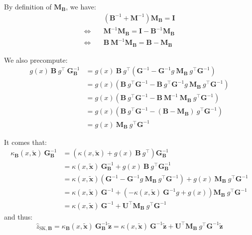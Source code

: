 By definition of $\mathbf{M}_{\mathbf{B}}$, we have:
\begin{equation}
	\begin{aligned}
	&\left(\mathbf{B}^{-1}+\mathbf{M}^{-1}\right)\mathbf{M}_{\mathbf{B}}=\mathbf{I}\\
	\iff\quad&\mathbf{M}^{-1}\mathbf{M}_{\mathbf{B}}=\mathbf{I}-\mathbf{B}^{-1}\mathbf{M}_{\mathbf{B}}\\
	\iff\quad&\mathbf{B}\:\mathbf{M}^{-1}\mathbf{M}_{\mathbf{B}}=\mathbf{B}-\mathbf{M}_{\mathbf{B}}
	\end{aligned}\label{eq:M_B_identity}
\end{equation}

We also precompute:
\begin{equation}
	\begin{aligned}
	g(x)\:\mathbf{B}\:g^\top\:\mathbf{G}_{\mathbf{B}}^{-1}&=g(x)\:\mathbf{B}\:g^\top\left(\mathbf{G}^{-1}-\mathbf{G}^{-1}g\:\mathbf{M}_{\mathbf{B}}\:g^\top \mathbf{G}^{-1}\right)\\
	&=g(x)\left(\mathbf{B}\:g^\top \mathbf{G}^{-1}-\mathbf{B}\:g^\top \mathbf{G}^{-1}g\:\mathbf{M}_{\mathbf{B}}\:g^\top \mathbf{G}^{-1}\right)\\
	&=g(x)\left(\mathbf{B}\:g^\top \mathbf{G}^{-1}-\mathbf{B}\:\mathbf{M}^{-1}\:\mathbf{M}_{\mathbf{B}}\:g^\top \mathbf{G}^{-1}\right)\\
	&=g(x)\left(\mathbf{B}\:g^\top \mathbf{G}^{-1}-(\mathbf{B}-\mathbf{M}_{\mathbf{B}})\:g^\top \mathbf{G}^{-1}\right)\\
	&=g(x)\:\mathbf{M}_{\mathbf{B}}\:g^\top \mathbf{G}^{-1}
	\end{aligned}
\end{equation}

It comes that:
\begin{equation}
	\begin{aligned}
	\kappa_{\mathbf{B}}(x,\tilde{\mathbf{x}})\:\mathbf{G}_{\mathbf{B}}^{-1}&=\left(\kappa(x,\tilde{\mathbf{x}})+g(x)\:\mathbf{B}\:g^\top\right)\mathbf{G}_{\mathbf{B}}^{-1}\\
	&=\kappa(x,\tilde{\mathbf{x}})\:\mathbf{G}_{\mathbf{B}}^{-1}+g(x)\:\mathbf{B}\:g^\top \mathbf{G}_{\mathbf{B}}^{-1}\\
	&=\kappa(x,\tilde{\mathbf{x}})\left(\mathbf{G}^{-1}-\mathbf{G}^{-1}g\:\mathbf{M}_{\mathbf{B}}\:g^\top \mathbf{G}^{-1}\right)+g(x)\:\mathbf{M}_{\mathbf{B}}\:g^\top \mathbf{G}^{-1}\\
	&=\kappa(x,\tilde{\mathbf{x}})\:\mathbf{G}^{-1}+\left(-\kappa(x,\tilde{\mathbf{x}})\:\mathbf{G}^{-1}g+g(x)\right)\mathbf{M}_{\mathbf{B}}\:g^\top \mathbf{G}^{-1}\\
	&=\kappa(x,\tilde{\mathbf{x}})\:\mathbf{G}^{-1}+\mathbf{U}^\top \mathbf{M}_{\mathbf{B}}\:g^\top \mathbf{G}^{-1}
	\end{aligned}
\end{equation}
and thus:
\begin{equation}
	\hat{z}_{\mathrm{SK},\mathbf{B}}=\kappa_{\mathbf{B}}(x,\tilde{\mathbf{x}})\:\mathbf{G}_{\mathbf{B}}^{-1}\tilde{\mathbf{z}}=\kappa(x,\tilde{\mathbf{x}})\:\mathbf{G}^{-1}\tilde{\mathbf{z}}+\mathbf{U}^\top \mathbf{M}_{\mathbf{B}}\:g^\top \mathbf{G}^{-1}\tilde{\mathbf{z}}
\end{equation}

